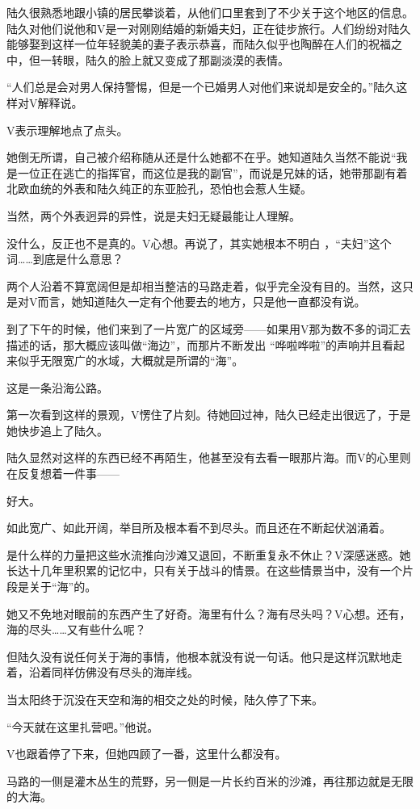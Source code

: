 陆久很熟悉地跟小镇的居民攀谈着，从他们口里套到了不少关于这个地区的信息。陆久对他们说他和V是一对刚刚结婚的新婚夫妇，正在徒步旅行。人们纷纷对陆久能够娶到这样一位年轻貌美的妻子表示恭喜，而陆久似乎也陶醉在人们的祝福之中，但一转眼，陆久的脸上就又变成了那副淡漠的表情。

“人们总是会对男人保持警惕，但是一个已婚男人对他们来说却是安全的。”陆久这样对V解释说。

V表示理解地点了点头。

她倒无所谓，自己被介绍称随从还是什么她都不在乎。她知道陆久当然不能说“我是一位正在逃亡的指挥官，而这位是我的副官”，而说是兄妹的话，她带那副有着北欧血统的外表和陆久纯正的东亚脸孔，恐怕也会惹人生疑。

当然，两个外表迥异的异性，说是夫妇无疑最能让人理解。

没什么，反正也不是真的。V心想。再说了，其实她根本不明白 ，“夫妇”这个词……到底是什么意思？

两个人沿着不算宽阔但是却相当整洁的马路走着，似乎完全没有目的。当然，这只是对V而言，她知道陆久一定有个他要去的地方，只是他一直都没有说。

到了下午的时候，他们来到了一片宽广的区域旁——如果用V那为数不多的词汇去描述的话，那大概应该叫做“海边”，而那片不断发出 “哗啦哗啦”的声响并且看起来似乎无限宽广的水域，大概就是所谓的“海”。

这是一条沿海公路。

第一次看到这样的景观，V愣住了片刻。待她回过神，陆久已经走出很远了，于是她快步追上了陆久。

陆久显然对这样的东西已经不再陌生，他甚至没有去看一眼那片海。而V的心里则在反复想着一件事——

好大。

如此宽广、如此开阔，举目所及根本看不到尽头。而且还在不断起伏汹涌着。

是什么样的力量把这些水流推向沙滩又退回，不断重复永不休止？V深感迷惑。她长达十几年里积累的记忆中，只有关于战斗的情景。在这些情景当中，没有一个片段是关于“海”的。

她又不免地对眼前的东西产生了好奇。海里有什么？海有尽头吗？V心想。还有，海的尽头……又有些什么呢？

但陆久没有说任何关于海的事情，他根本就没有说一句话。他只是这样沉默地走着，沿着同样仿佛没有尽头的海岸线。

当太阳终于沉没在天空和海的相交之处的时候，陆久停了下来。

“今天就在这里扎营吧。”他说。

V也跟着停了下来，但她四顾了一番，这里什么都没有。

马路的一侧是灌木丛生的荒野，另一侧是一片长约百米的沙滩，再往那边就是无限的大海。

